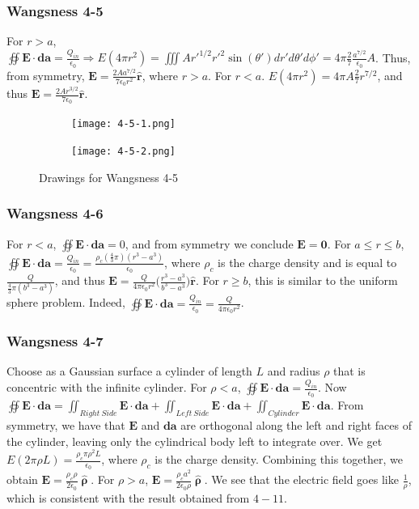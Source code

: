 \documentclass[oneside]{book}
\theoremstyle{mystyle}
\begin{document}
\subsubsection{Wangsness 4-5}
For $r>a$, $\oiint \mathbf{E}\cdot \mathbf{da} = \frac{Q_{in}}{\epsilon_0} \Rightarrow E(4\pi r^2) = \iiint A r'^{1/2}r'^2 \sin(\theta ')dr'd\theta'd\phi' = 4\pi \frac{2}{7}\frac{a^{7/2}}{\epsilon_0}A$. Thus, from symmetry, $\mathbf{E} = \frac{2A a^{7/2}}{7 \epsilon_0 r^2}\hat{\mathbf{r}}$, where $r>a$. For $r<a$. $E(4\pi r^2) = 4\pi A \frac{2}{7}r^{7/2}$, and thus $\mathbf{E} = \frac{2Ar^{3/2}}{7\epsilon_0}\hat{\mathbf{r}}$. 
\begin{figure}
  \begin{subfigure}[b]{0.49\textwidth}
     \centering
    \texttt{[image: 4-5-1.png]}
  \end{subfigure}
  \begin{subfigure}[b]{0.49\textwidth}
    \centering
    \texttt{[image: 4-5-2.png]}
  \end{subfigure}
  \caption{Drawings for Wangsness 4-5}
\end{figure}
\subsubsection{Wangsness 4-6}
For $r<a$, $\oiint\mathbf{E} \cdot \mathbf{da} = 0$, and from symmetry we conclude $\mathbf{E} = \mathbf{0}$. For $a\leq r \leq b$, $\oiint \mathbf{E}\cdot \mathbf{da} = \frac{Q_{in}}{\epsilon_0} = \frac{\rho_c(\frac{4}{3}\pi)(r^3-a^3)}{\epsilon_0}$, where $\rho_c$ is the charge density and is equal to $\frac{Q}{\frac{4}{3}\pi(b^3-a^3)}$, and thus $\mathbf{E} = \frac{Q}{4\pi \epsilon_0 r^2}\bigg(\frac{r^3-a^3}{b^3-a^3}\bigg)\hat{\mathbf{r}}$. For $r\geq b$, this is similar to the uniform sphere problem. Indeed, $\oiint \mathbf{E}\cdot \mathbf{da} = \frac{Q_{in}}{\epsilon_0} = \frac{Q}{4\pi \epsilon_0 r^2}$.
\subsubsection{Wangsness 4-7}
Choose as a Gaussian surface a cylinder of length $L$ and radius $\rho$ that is concentric with the infinite cylinder. For $\rho<a$, $\oiint \mathbf{E}\cdot \mathbf{da} = \frac{Q_{in}}{\epsilon_0}$. Now $\oiint \mathbf{E} \cdot \mathbf{da} = \iint_{Right\ Side} \mathbf{E}\cdot \mathbf{da} + \iint_{Left\ Side}\mathbf{E}\cdot \mathbf{da} + \iint_{Cylinder} \mathbf{E}\cdot \mathbf{da}$. From symmetry, we have that $\mathbf{E}$ and $\mathbf{da}$ are orthogonal along the left and right faces of the cylinder, leaving only the cylindrical body left to integrate over. We get $E(2\pi \rho L) = \frac{\rho_c \pi \rho^2 L}{\epsilon_0}$, where $\rho_c$ is the charge density. Combining this together, we obtain $\mathbf{E} = \frac{\rho_c \rho}{2\epsilon_0} \hat{\boldsymbol{\uprho}}$. For $\rho>a$, $\mathbf{E} = \frac{\rho_{c} a^2}{2\epsilon_0 \rho}\hat{\boldsymbol{\uprho}}$. We see that the electric field goes like $\frac{1}{\rho}$, which is consistent with the result obtained from $4-11$.
\end{document}
